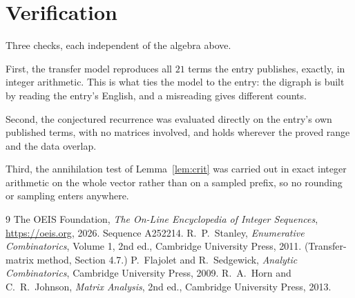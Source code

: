 \documentclass[11pt,a4paper]{article}
\theoremstyle{plain}
\theoremstyle{definition}
\begin{document}
\section{Verification}

Three checks, each independent of the algebra above.

First, the transfer model reproduces all $21$ terms the entry publishes, exactly, in
integer arithmetic. This is what ties the model to the entry: the digraph is built by reading
the entry's English, and a misreading gives different counts.

Second, the conjectured recurrence was evaluated directly on the entry's own published terms,
with no matrices involved, and holds wherever the proved range and the data overlap.

Third, the annihilation test of Lemma~\ref{lem:crit} was carried out in exact integer
arithmetic on the whole vector rather than on a sampled prefix, so no rounding or sampling
enters anywhere.

\begin{thebibliography}{9}
 The OEIS Foundation, \emph{The On-Line Encyclopedia of Integer
Sequences}, \url{https://oeis.org}, 2026. Sequence A252214.
 R.~P.~Stanley, \emph{Enumerative Combinatorics}, Volume 1, 2nd ed.,
Cambridge University Press, 2011. (Transfer-matrix method, Section 4.7.)
 P.~Flajolet and R.~Sedgewick, \emph{Analytic Combinatorics}, Cambridge
University Press, 2009.
 R.~A.~Horn and C.~R.~Johnson, \emph{Matrix Analysis}, 2nd ed., Cambridge
University Press, 2013.
\end{thebibliography}
\end{document}
